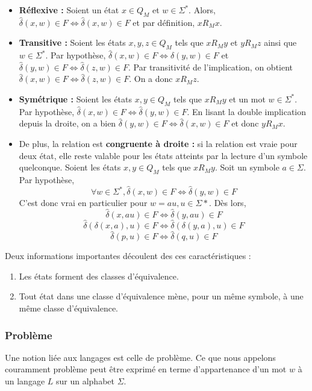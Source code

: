 	 \begin{itemize}
	 	\item \textbf{Réflexive :} Soient un état $x \in Q_M$ et $w \in \Sigma^*$. Alors, $\hat{\delta}(x,w) \in F \iff \hat{\delta}(x,w) \in F$ et par définition, $xR_Mx$.
	 	\item \textbf{Transitive :} Soient les états $x,y,z \in Q_M$ tels que $xR_My$ et $yR_Mz$ ainsi que $w \in \Sigma^*$. Par hypothèse, $\hat{\delta}(x,w) \in F \iff \hat{\delta}(y,w)\in F$ et $\hat{\delta}(y,w) \in F\iff \hat{\delta}(z,w) \in F$. Par transitivité de l'implication, on obtient $\hat{\delta}(x,w) \in F \iff \hat{\delta}(z,w)\in F$. On a donc $xR_Mz$.
	 	\item \textbf{Symétrique : } Soient les états $x,y \in Q_M$ tels que $xR_My$ et un mot $w \in \Sigma^*$. Par hypothèse, $\hat{\delta}(x, w)\in F \iff \hat{\delta}(y, w)\in F$. En lisant la double implication depuis la droite, on a bien $\hat{\delta}(y, w) \in F\iff \hat{\delta}(x, w)\in F$ et donc $yR_Mx$.
	 	\item De plus, la relation est \textbf{congruente à droite :} si la relation est vraie pour deux état, elle reste valable pour les états atteints par la lecture d'un symbole quelconque. Soient les états $x,y \in Q_M$ tels que $xR_My$. Soit un symbole $a \in \Sigma$. Par hypothèse, 
	 	$$\forall w \in \Sigma^*, \hat{\delta}(x, w) \in F \iff \hat{\delta}(y, w) \in F$$
	 	C'est donc vrai en particulier pour $w = au, u \in \Sigma*$. Dès lors,
	 	$$\hat{\delta}(x, au) \in F\iff \hat{\delta}(y, au)\in F$$
	 	$$\hat{\delta}(\delta(x,a),u) \in F\iff\hat{\delta}(\delta(y,a),u)\in F$$
	 	$$\hat{\delta}(p,u) \in F\iff \hat{\delta}(q,u)\in F$$
	 \end{itemize}
	 
	 Deux informations importantes découlent des ces caractéristiques : 
	 \begin{enumerate}
	 	\item Les états forment des classes d'équivalence.
	 	\item Tout état dans une classe d'équivalence mène, pour un même symbole, à une même classe d'équivalence.
	 \end{enumerate}
	 
	 	\subsubsection{Problème}
	 Une notion liée aux langages est celle de problème. Ce que nous appelons couramment problème peut être exprimé en terme d'appartenance d'un mot $w$ à un langage $L$ sur un alphabet $\Sigma$.
	 
